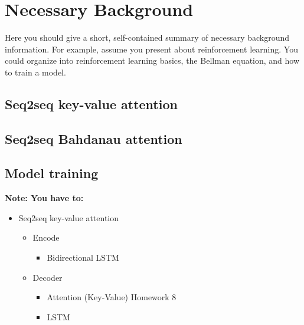 \documentclass{article}
\begin{document}
\section{Necessary Background}
\label{sec:background}

Here you should give a short, self-contained summary of necessary
background information. For example, assume you present about reinforcement learning. You could organize into reinforcement learning basics, the Bellman equation, and how to train a model.

\subsection{Seq2seq key-value attention}

\subsection{Seq2seq Bahdanau attention}

\subsection{Model training}

{\bf Note: You have to:}
\begin{itemize}
\item Seq2seq key-value attention				
\begin{itemize}
\item Encode
\begin{itemize}
\item Bidirectional LSTM
\end{itemize}
\end{itemize}
\begin{itemize}
\item Decoder
\begin{itemize}
\item Attention (Key-Value) Homework 8
\end{itemize}
\begin{itemize}
\item LSTM
\end{itemize}
\end{itemize}
\end{itemize}
\end{document}
